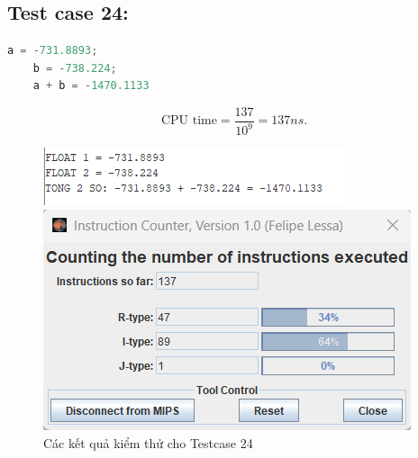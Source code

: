\subsection{Test case 24:}
\begin{lstlisting}[language=Python]
    a = -731.8893;
    b = -738.224;
    a + b = -1470.1133
\end{lstlisting}
\[
\text{CPU time} = \frac{\text{137}}{10^9} = 137 ns.
\]
\begin{figure}[!h]
    \centering
    \begin{minipage}[b]{0.48\textwidth}
        \centering
        \includegraphics[width=\textwidth]{image/TESTCASE/Testcase 24.png}
    \end{minipage}
    \hfill
    \begin{minipage}[b]{0.48\textwidth}
        \centering
        \includegraphics[width=\textwidth]{image/TESTCASE/Instruction Counter 24.png}
    \end{minipage}
    \vspace{0.5cm}
    \caption{Các kết quả kiểm thử cho Testcase 24}
\end{figure}







